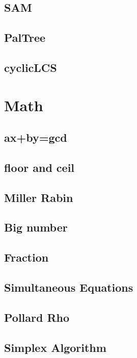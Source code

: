 \subsection{SAM}

\subsection{PalTree}

\subsection{cyclicLCS}



\section{Math}
\subsection{ax+by=gcd}

\subsection{floor and ceil}

\subsection{Miller Rabin}

\subsection{Big number}

\subsection{Fraction}

\subsection{Simultaneous Equations}

\subsection{Pollard Rho}

\subsection{Simplex Algorithm}

